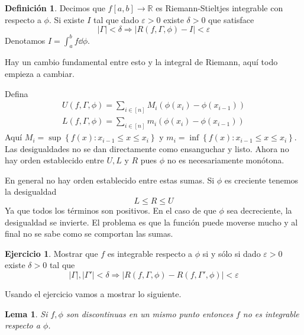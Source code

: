 \documentclass[12pt]{article}
\theoremstyle{plain}
\newtheorem{Lem}[Th]{Lema}             %
\theoremstyle{definition}
\newtheorem{Def}[Th]{Definición}       %
\newtheorem{Ej}[Th]{Ejercicio}
\theoremstyle{remark}
\numberwithin{equation}{section}
\newcommand{\bR}{\mathbb{R}}        %
\renewcommand{\leq}{\leqslant}      %
\renewcommand{\:}{\colon}           %
\newcommand{\conj}[1]{\left\lbrace#1\right\rbrace}
\newcommand{\bonj}[1]{\left\lbrack#1\right\rbrack}
\begin{document}
\begin{multicols}{2}
\begin{Def}
  Decimos que $f\bonj{a,b}\to\bR$ es Riemann-Stieltjes integrable con respecto a $\phi$. Si existe $I$ tal que dado $\varepsilon>0$ existe $\delta>0$ que satisface
  $$|\Gamma|<\delta\Rightarrow|R(f,\Gamma,\phi)-I|<\varepsilon$$
  Denotamos $I=\int_{a}^{b}f\dd\phi$.
\end{Def}
Hay un cambio fundamental entre esto y la integral de Riemann, aquí todo empieza a cambiar. \par
Defina
\begin{gather*}
  U(f,\Gamma,\phi)=\sum_{i\in\bonj{n}}M_i(\phi(x_i)-\phi(x_{i-1})) \\
  L(f,\Gamma,\phi)=\sum_{i\in\bonj{n}}m_i(\phi(x_i)-\phi(x_{i-1}))
\end{gather*}
Aquí $M_i=\sup\conj{f(x)\: x_{i-1}\leq x\leq x_i}$ y $m_i=\inf\conj{f(x)\: x_{i-1}\leq x\leq x_i}$. Las desigualdades no se dan directamente como ensanguchar y listo. Ahora no hay orden establecido entre $U,L$ y $R$ pues $\phi$ no es necesariamente monótona.\par
En general no hay orden establecido entre estas sumas. Si $\phi$ es creciente tenemos la desigualdad
$$L\leq R\leq U$$
Ya que todos los términos son positivos. En el caso de que $\phi$ sea decreciente, la desigualdad se invierte. El problema es que la función puede moverse mucho y al final no se sabe como se comportan las sumas.

\begin{Ej}
  Mostrar que $f$ es integrable respecto a $\phi$ si y sólo si dado $\varepsilon>0$ existe $\delta>0$ tal que
  $$|\Gamma|,|\Gamma'|<\delta\Rightarrow|R(f,\Gamma,\phi)-R(f,\Gamma',\phi)|<\varepsilon$$
\end{Ej}

Usando el ejercicio vamos a mostrar lo siguiente.
\begin{Lem}
  Si $f,\phi$ son discontinuas en un mismo punto entonces $f$ no es integrable respecto a $\phi$.
\end{Lem}


\end{multicols}
\end{document}
